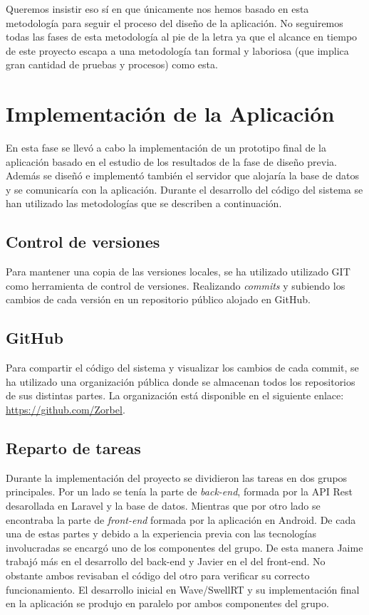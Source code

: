 Queremos insistir eso sí en que únicamente nos hemos basado en esta metodología para seguir el proceso del diseño de la aplicación. No seguiremos todas las fases de esta metodología al pie de la letra ya que el alcance en tiempo de este proyecto escapa a una metodología tan formal y laboriosa (que implica gran cantidad de pruebas y procesos) como esta.

\section{Implementación de la Aplicación}

En esta fase se llevó a cabo la implementación de un prototipo final de la aplicación basado en el estudio de los resultados de la fase de diseño previa. Además se diseñó e implementó también el servidor que alojaría la base de datos y se comunicaría con la aplicación. Durante el desarrollo del código del sistema se han utilizado las metodologías que se describen a continuación.

\subsection{Control de versiones}

Para mantener una copia de las versiones locales, se ha utilizado utilizado GIT como herramienta de control de versiones. Realizando \textit{commits} y subiendo los cambios de cada versión en un repositorio público alojado en GitHub.

\subsection{GitHub}

Para compartir el código del sistema y visualizar los cambios de cada commit, se ha utilizado una organización pública donde se almacenan todos los repositorios de sus distintas partes. La organización está disponible en el siguiente enlace: \url{https://github.com/Zorbel}.

\subsection{Reparto de tareas}

Durante la implementación del proyecto se dividieron las tareas en dos grupos principales. Por un lado se tenía la parte de \textit{back-end}, formada por la API Rest desarollada en Laravel y la base de datos. Mientras que por otro lado se encontraba la parte de \textit{front-end} formada por la aplicación en Android. De cada una de estas partes y debido a la experiencia previa con las tecnologías involucradas se encargó uno de los componentes del grupo. De esta manera Jaime trabajó más en el desarrollo del back-end y Javier en el del front-end. No obstante ambos revisaban el código del otro para verificar su correcto funcionamiento. El desarrollo inicial en Wave/SwellRT y su implementación final en la aplicación se produjo en paralelo por ambos componentes del grupo.

